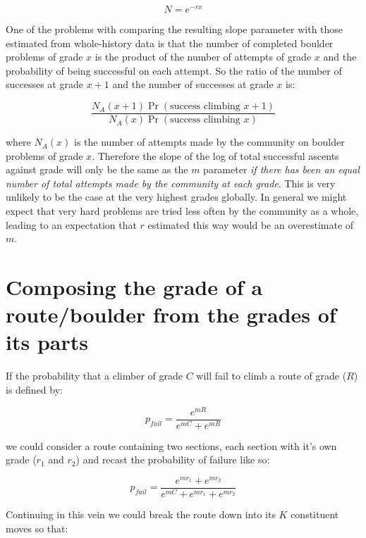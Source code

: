 \documentclass[11pt]{article}
\begin{document}
\begin{equation}
N = e^{-rx} 
\end{equation}

One of the problems with comparing the resulting slope parameter with those estimated from whole-history data is that the number of completed boulder problems of grade $x$ is the product of the number of attempts of grade $x$ and the probability of being successful on each attempt. So the ratio of the number of successes at grade $x+1$ and the number of successes at grade $x$ is:

\begin{equation}
\frac{N_A(x+1)\Pr(\textrm{success climbing } x+1 )}{N_A(x)\Pr(\textrm{success climbing } x)}
\end{equation}

where $N_A(x)$ is the number of attempts made by the community on boulder problems of grade $x$. 
Therefore the slope of the log of total successful ascents against grade will only be the same as the $m$ parameter {\it if there has been an equal number of total attempts made by the community at each grade}. This is very unlikely to be the case at the very highest grades globally. In general we might expect that very hard problems are tried less often by the community as a whole, leading to an expectation that $r$ estimated this way would be an overestimate of $m$.


\section{Composing the grade of a route/boulder from the grades of its parts}

If the probability that a climber of grade $C$ will fail to climb a route of grade ($R$) is defined by:

\begin{equation}
p_{fail} = \frac{e^{mR}}{e^{mC} + e^{mR}}
\end{equation} 

we could consider a route containing two sections, each section with it's own grade ($r_1$ and $r_2$) and recast the probability of failure like so:

\begin{equation}
p_{fail} = \frac{e^{mr_1} + e^{mr_2}}{e^{mC} + e^{mr_1} + e^{mr_2}}
\end{equation} 

Continuing in this vein we could break the route down into its $K$ constituent moves so that:
\end{document}
